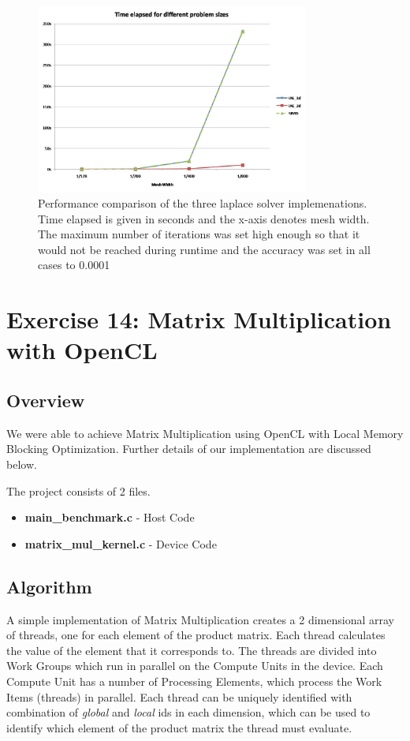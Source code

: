 \documentclass[]{scrartcl}
\begin{document}
\begin{figure}[hb]
	\centering
	\includegraphics[width=0.8\textwidth]{poissonIAE_time}
	\caption{Performance comparison of the three laplace solver implemenations. Time elapsed is given in seconds and the x-axis denotes mesh width. The maximum number of iterations was set high enough so that it would not be reached during runtime and the accuracy was set in all cases to 0.0001}
\end{figure}


\pagebreak
\section{Exercise 14: Matrix Multiplication with OpenCL}

\subsection{Overview}
We were able to achieve Matrix Multiplication using OpenCL with Local Memory Blocking Optimization.
Further details of our implementation are discussed below.

The project consists of 2 files.
\begin{itemize}
	\item \textbf{main\_benchmark.c} - Host Code
	\item \textbf{matrix\_mul\_kernel.c} - Device Code
\end{itemize}

\subsection{Algorithm}
A simple implementation of Matrix Multiplication creates a 2 dimensional array of threads, one for
each element of the product matrix. Each thread calculates the value of the element that it corresponds to. The threads are divided into Work Groups which run in parallel on the Compute Units
in the device. Each Compute Unit has a number of Processing Elements, which process the Work Items
(threads) in parallel. Each thread can be uniquely identified with combination of \textit{global} and \textit{local} ids in each dimension, which can be used to identify which element of the product
matrix the thread must evaluate.
\end{document}
